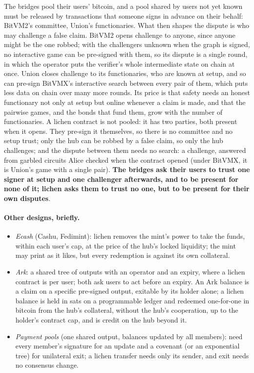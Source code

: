 \documentclass[11pt]{article}
\begin{document}
The bridges pool their users' bitcoin, and a pool shared by users not
yet known must be released by transactions that someone signs in
advance on their behalf: BitVM2's committee, Union's functionaries.
What then shapes the dispute is who may challenge a false claim. BitVM2
opens challenge to anyone, since anyone might be the one robbed; with
the challengers unknown when the graph is signed, no interactive game
can be pre-signed with them, so its dispute is a single round, in which
the operator puts the verifier's whole intermediate state on chain at
once. Union closes challenge to its functionaries, who are known at
setup, and so can pre-sign BitVMX's interactive search between every
pair of them, which puts less data on chain over many more rounds. Its
price is that safety needs an honest functionary not only at setup but
online whenever a claim is made, and that the pairwise games, and the
bonds that fund them, grow with the number of functionaries. A lichen
contract is not pooled: it has two parties, both present when it opens.
They pre-sign it themselves, so there is no committee and no setup
trust; only the hub can be robbed by a false claim, so only the hub
challenges; and the dispute between them needs no search: a challenge,
answered from garbled circuits Alice checked when the contract opened
(under BitVMX, it is Union's game with a single pair). \textbf{The bridges ask their users
to trust one signer at setup and one challenger afterwards, and to be
present for none of it; lichen asks them to trust no one, but to be
present for their own disputes}.

\paragraph{Other designs, briefly.}
\begin{itemize}[leftmargin=1.5em]
\item \emph{Ecash} (Cashu, Fedimint): lichen removes the mint's power to
  take the funds, within each user's cap, at the price of the hub's
  locked liquidity; the mint may print as it likes, but every redemption
  is against its own collateral.
\item \emph{Ark}: a shared tree of outputs with an operator and an
  expiry, where a lichen contract is per user; both ask users to act
  before an expiry. An Ark balance is a claim on a specific pre-signed
  output, exitable by its holder alone; a lichen balance is held in sats
  on a programmable ledger and redeemed one-for-one in bitcoin from the
  hub's collateral, without the hub's cooperation, up to the holder's
  contract cap, and is credit on the hub beyond it.
\item \emph{Payment pools} (one shared output, balances updated by all
  members): need every member's signature for an update and a covenant
  (or an exponential tree) for unilateral exit; a lichen transfer needs
  only its sender, and exit needs no consensus change.
\end{itemize}
\end{document}

